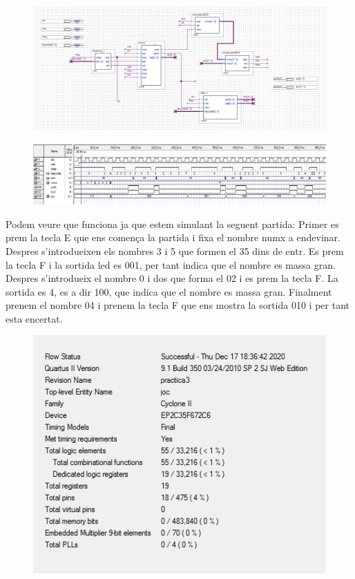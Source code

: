 \documentclass[12pt, a4papre]{article}
\begin{document}
				\begin{figure}[H]
		\begin{center}
		\includegraphics[width=130mm]{joc.jpeg}
		\end{center}
	\end{figure}	
			\begin{figure}[H]
		\begin{center}
		\includegraphics[width=130mm]{simulacioJocNou.jpeg}
		\end{center}
	\end{figure}	
	
	Podem veure que funciona ja que estem simulant la seguent partida: Primer es prem la tecla E que ens comença la partida i fixa el nombre numx a endevinar. Despres s'introdueixen els nombres 3 i 5 que formen el 35 dins de entr. Es prem la tecla F i la sortida led es 001, per tant indica que el nombre es massa gran. Despres s'introdueix el nombre 0 i dos que forma el 02 i es prem la tecla F. La sortida es 4, es a dir 100, que indica que el nombre es massa gran. Finalment prenem el nombre 04 i prenem la tecla F que ens mostra la sortida 010 i per tant esta encertat.
		
			\begin{figure}[H]
		\begin{center}
		\includegraphics[width=130mm]{informeJoc.jpeg}
		\end{center}
	\end{figure}	
\end{document}
